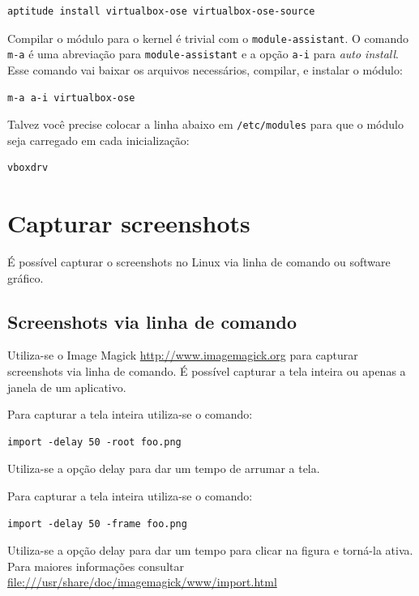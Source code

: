 \documentclass[12pt,brazil]{book}
\begin{document}
\begin{verbatim}
aptitude install virtualbox-ose virtualbox-ose-source
\end{verbatim}

Compilar o módulo para o kernel é trivial com o
\texttt{module-assistant}. O comando \texttt{m-a} é uma abreviação
para \texttt{module-assistant} e a opção \texttt{a-i} para
\textit{auto install}. Esse comando vai baixar os arquivos
necessários, compilar, e instalar o módulo:

\begin{verbatim}
m-a a-i virtualbox-ose
\end{verbatim}

Talvez você precise colocar a linha abaixo em \texttt{/etc/modules}
para que o módulo seja carregado em cada inicialização:

\begin{verbatim}
vboxdrv
\end{verbatim}

\chapter{Capturar screenshots}
\label{cha:capt-scre}

É possível capturar o screenshots no Linux via linha de comando ou
software gráfico.

\section{Screenshots via linha de comando}
\label{sec:scre-via-linha}

Utiliza-se o Image Magick \url{http://www.imagemagick.org} para
capturar screenshots via linha de comando. É possível capturar a tela
inteira ou apenas a janela de um aplicativo.

Para capturar a tela inteira utiliza-se o comando:

\begin{verbatim}
import -delay 50 -root foo.png
\end{verbatim}

Utiliza-se a opção delay para dar um tempo de arrumar a tela.

Para capturar a tela inteira utiliza-se o comando:

\begin{verbatim}
import -delay 50 -frame foo.png
\end{verbatim}

Utiliza-se a opção delay para dar um tempo para clicar na figura e
torná-la ativa. Para maiores informações consultar
\url{file:///usr/share/doc/imagemagick/www/import.html}
\end{document}

